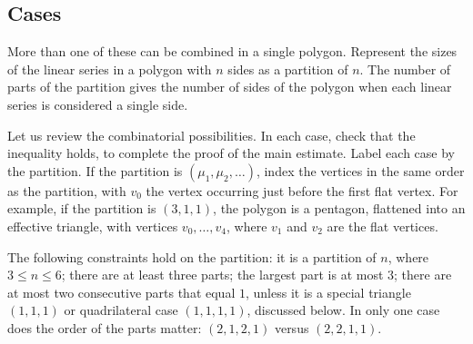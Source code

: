 \subsection{Cases}

More than one of these can be combined in a single polygon.   Represent the sizes of the linear series in a polygon with $n$ sides as a partition of $n$.
The number of parts of the partition gives the number of sides of the polygon when each linear series is considered a single side. 

Let us review the combinatorial possibilities.  In each case,  check that the inequality holds, to complete the proof of the main estimate.  Label each 
case by the partition.  If the partition is $(\mu_1,\mu_2,\ldots)$, 
index the vertices in the same order as the partition, with $v_0$
the vertex occurring just before the first flat vertex.  For example,
if the partition is $(3,1,1)$, the polygon is a pentagon, flattened into
an effective triangle, with vertices $v_0,\ldots,v_4$, where $v_1$ and $v_2$
are the flat vertices.

The following constraints hold on the partition: it is
a partition of $n$, where $3\le n\le 6$; there
are at least three parts; the largest part is at most $3$;  there are
at most two consecutive parts that equal $1$, unless it is a special triangle $(1,1,1)$ or
quadrilateral case $(1,1,1,1)$, discussed below.  In only one case
does the order of the parts matter: $(2,1,2,1)$ versus $(2,2,1,1)$.

